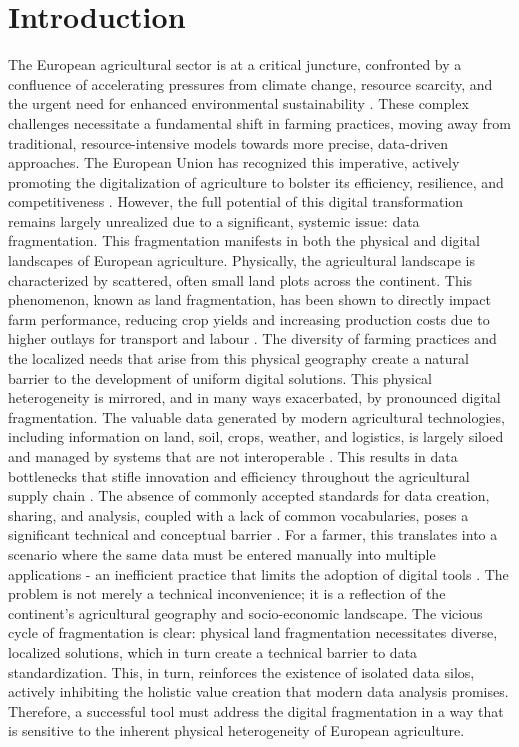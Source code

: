 \documentclass[preprint,12pt,authoryear]{elsarticle}
\begin{document}
\section{Introduction}
\label{Intro}
The European agricultural sector is at a critical juncture, confronted by a confluence of accelerating pressures from climate change, resource scarcity, and the urgent need for enhanced environmental sustainability \citep{Bleischwitz2018}. These complex challenges necessitate a fundamental shift in farming practices, moving away from traditional, resource-intensive models towards more precise, data-driven approaches. The European Union has recognized this imperative, actively promoting the digitalization of agriculture to bolster its efficiency, resilience, and competitiveness \citep{EU2022, EUComistion25}. However, the full potential of this digital transformation remains largely unrealized due to a significant, systemic issue: data fragmentation. This fragmentation manifests in both the physical and digital landscapes of European agriculture. Physically, the agricultural landscape is characterized by scattered, often small land plots across the continent. This phenomenon, known as land fragmentation, has been shown to directly impact farm performance, reducing crop yields and increasing production costs due to higher outlays for transport and labour \citep{Latruffe2014}. The diversity of farming practices and the localized needs that arise from this physical geography create a natural barrier to the development of uniform digital solutions.
This physical heterogeneity is mirrored, and in many ways exacerbated, by pronounced digital fragmentation. The valuable data generated by modern agricultural technologies, including information on land, soil, crops, weather, and logistics, is largely siloed and managed by systems that are not interoperable \citep{EU2022}. This results in data bottlenecks that stifle innovation and efficiency throughout the agricultural supply chain \citep{Lankoski2023}. The absence of commonly accepted standards for data creation, sharing, and analysis, coupled with a lack of common vocabularies, poses a significant technical and conceptual barrier \citep{EU2022}. For a farmer, this translates into a scenario where the same data must be entered manually into multiple applications - an inefficient practice that limits the adoption of digital tools \citep{Lankoski2023}.
The problem is not merely a technical inconvenience; it is a reflection of the continent's agricultural geography and socio-economic landscape. The vicious cycle of fragmentation is clear: physical land fragmentation necessitates diverse, localized solutions, which in turn create a technical barrier to data standardization. This, in turn, reinforces the existence of isolated data silos, actively inhibiting the holistic value creation that modern data analysis promises. Therefore, a successful tool must address the digital fragmentation in a way that is sensitive to the inherent physical heterogeneity of European agriculture.
\end{document}
